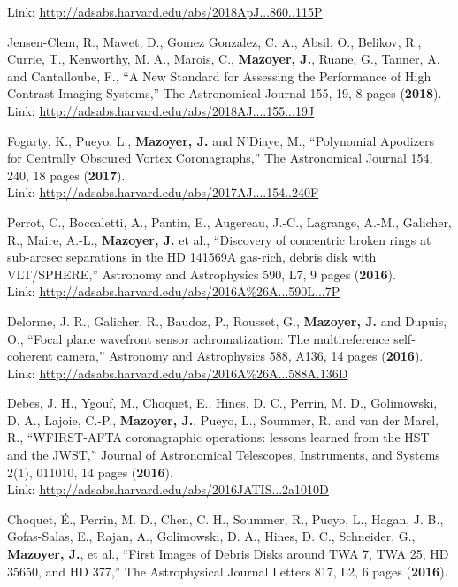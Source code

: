 \documentclass[12pt]{article}
\begin{document}
\begin{etaremune}
Link: \textcolor{BrickRed}{\underline{\url{http://adsabs.harvard.edu/abs/2018ApJ...860..115P}}}
\item Jensen-Clem, R., Mawet, D., Gomez Gonzalez, C. A., Absil, O., Belikov, R., Currie, T., Kenworthy, M. A., Marois, C., \textbf{Mazoyer, J.}, Ruane, G., Tanner, A. and Cantalloube, F., “A New Standard for Assessing the Performance of High Contrast Imaging Systems,” The Astronomical Journal 155, 19, 8 pages (\textbf{2018}).\\
Link: \textcolor{BrickRed}{\underline{\url{http://adsabs.harvard.edu/abs/2018AJ....155...19J}}}
\item Fogarty, K., Pueyo, L., \textbf{Mazoyer, J.} and N’Diaye, M., “Polynomial Apodizers for Centrally Obscured Vortex Coronagraphs,” The Astronomical Journal 154, 240, 18 pages (\textbf{2017}).\\
Link: \textcolor{BrickRed}{\underline{\url{http://adsabs.harvard.edu/abs/2017AJ....154..240F}}}
\item Perrot, C., Boccaletti, A., Pantin, E., Augereau, J.-C., Lagrange, A.-M., Galicher, R., Maire, A.-L., \textbf{Mazoyer, J.} et al., “Discovery of concentric broken rings at sub-arcsec separations in the HD 141569A gas-rich, debris disk with VLT/SPHERE,” Astronomy and Astrophysics 590, L7, 9 pages (\textbf{2016}).\\
Link: \textcolor{BrickRed}{\underline{\url{http://adsabs.harvard.edu/abs/2016A\%26A...590L...7P}}}
\item Delorme, J. R., Galicher, R., Baudoz, P., Rousset, G., \textbf{Mazoyer, J.} and Dupuis, O., “Focal plane wavefront sensor achromatization: The multireference self-coherent camera,” Astronomy and Astrophysics 588, A136, 14 pages (\textbf{2016}).\\
Link: \textcolor{BrickRed}{\underline{\url{http://adsabs.harvard.edu/abs/2016A\%26A...588A.136D}}}
\item Debes, J. H., Ygouf, M., Choquet, E., Hines, D. C., Perrin, M. D., Golimowski, D. A., Lajoie, C.-P., \textbf{Mazoyer, J.}, Pueyo, L., Soummer, R. and van der Marel, R., “WFIRST-AFTA coronagraphic operations: lessons learned from the HST and the JWST,” Journal of Astronomical Telescopes, Instruments, and Systems 2(1), 011010, 14 pages (\textbf{2016}).\\
Link: \textcolor{BrickRed}{\underline{\url{http://adsabs.harvard.edu/abs/2016JATIS...2a1010D}}}
\item Choquet, É., Perrin, M. D., Chen, C. H., Soummer, R., Pueyo, L., Hagan, J. B., Gofas-Salas, E., Rajan, A., Golimowski, D. A., Hines, D. C., Schneider, G., \textbf{Mazoyer, J.}, et al., “First Images of Debris Disks around TWA 7, TWA 25, HD 35650, and HD 377,” The Astrophysical Journal Letters 817, L2, 6 pages (\textbf{2016}).\\

\end{etaremune}
\end{document}
